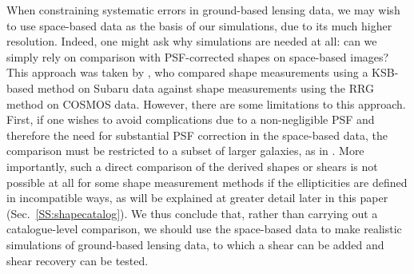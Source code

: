 \documentclass[twocolumn,useAMS,usenatbib]{mn2e}
\newcommand{\newtext}{}
\begin{document}
When constraining systematic errors in ground-based lensing data, we may wish to use space-based data as the
basis of our simulations, due to its much higher resolution.  Indeed,
one might ask why simulations are needed at all: can we
simply rely on comparison with PSF-corrected shapes on space-based
images?  This approach was taken by \cite{2008ApJ...684...34K}, who compared shape
measurements using a KSB-based method \citep{1995ApJ...449..460K,2003ApJ...597...98H} on Subaru data against
shape measurements using the RRG method \citep{2000ApJ...536...79R} on COSMOS data.
However, there are some limitations to this approach.  First, 
\newtext{if one wishes to avoid complications due to a non-negligible
  PSF and therefore the need for substantial PSF correction in the space-based data, the
  comparison must be restricted to a subset of larger galaxies, as in
  \cite{2008ApJ...684...34K}.} 
\newtext{More importantly}, such a direct 
comparison of the derived shapes or shears is not possible at all for some shape measurement methods
if the ellipticities are defined in incompatible ways, as will be
explained at greater detail later in this paper \newtext{(Sec.~\ref{SS:shapecatalog})}.   We thus conclude
that, rather than carrying out a catalogue-level comparison, we should use the space-based
data to make realistic simulations of ground-based lensing
data, to which a shear can be added and shear recovery can be tested. 
\end{document}
